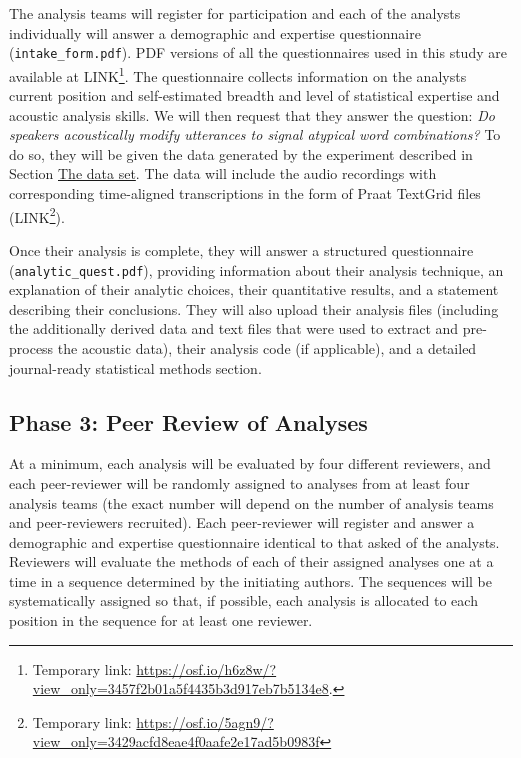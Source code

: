 \documentclass[Review,times,sageh]{sagej}
\begin{document}
The analysis teams will register for participation and each of the analysts individually will answer a demographic and expertise questionnaire (\texttt{intake\_form.pdf}).
PDF versions of all the questionnaires used in this study are available at LINK\footnote{Temporary link: \url{https://osf.io/h6z8w/?view_only=3457f2b01a5f4435b3d917eb7b5134e8}.}.
The questionnaire collects information on the analysts current position and self-estimated breadth and level of statistical expertise and acoustic analysis skills.
We will then request that they answer the question: \emph{Do speakers acoustically modify utterances to signal atypical word combinations?}
To do so, they will be given the data generated by the experiment described in Section \protect\hyperlink{s:dataset}{The data set}.
The data will include the audio recordings with corresponding time-aligned transcriptions in the form of Praat TextGrid files (LINK\footnote{Temporary link: \url{https://osf.io/5agn9/?view_only=3429acfd8eae4f0aafe2e17ad5b0983f}}).

Once their analysis is complete, they will answer a structured questionnaire (\texttt{analytic\_quest.pdf}), providing information about their analysis technique, an explanation of their analytic choices, their quantitative results, and a statement describing their conclusions.
They will also upload their analysis files (including the additionally derived data and text files that were used to extract and pre-process the acoustic data), their analysis code (if applicable), and a detailed journal-ready statistical methods section.

\hypertarget{phase-3-peer-review-of-analyses}{%
\subsection{Phase 3: Peer Review of Analyses}\label{phase-3-peer-review-of-analyses}}

At a minimum, each analysis will be evaluated by four different reviewers, and each peer-reviewer will be randomly assigned to analyses from at least four analysis teams (the exact number will depend on the number of analysis teams and peer-reviewers recruited).
Each peer-reviewer will register and answer a demographic and expertise questionnaire identical to that asked of the analysts.
Reviewers will evaluate the methods of each of their assigned analyses one at a time in a sequence determined by the initiating authors.
The sequences will be systematically assigned so that, if possible, each analysis is allocated to each position in the sequence for at least one reviewer.
\end{document}
